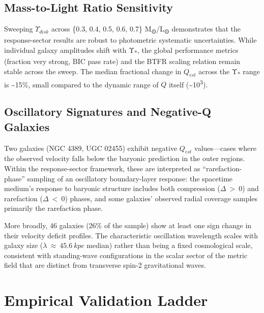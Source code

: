 \documentclass[11pt]{article}
\begin{document}
\subsection{Mass-to-Light Ratio Sensitivity}\label{mass-to-light-ratio-sensitivity}

Sweeping \(\Upsilon_{disk}\) across \{0.3, 0.4, 0.5, 0.6, 0.7\} M\textsubscript{⊙}/L\textsubscript{⊙} demonstrates that the response-sector results are robust to photometric systematic uncertainties. While individual galaxy amplitudes shift with Υ\textsubscript{*}, the global performance metrics (fraction very strong, BIC pass rate) and the BTFR scaling relation remain stable across the sweep. The median fractional change in \(Q_{est}\) across the Υ\textsubscript{*} range is \textasciitilde15\%, small compared to the dynamic range of \(Q\) itself (\textasciitilde10\textsuperscript{3}).

\subsection{Oscillatory Signatures and Negative-Q Galaxies}\label{oscillatory-signatures-and-negative-q-galaxies}

Two galaxies (NGC 4389, UGC 02455) exhibit negative \(Q_{est}\) values---cases where the observed velocity falls below the baryonic prediction in the outer regions. Within the response-sector framework, these are interpreted as ``rarefaction-phase'' sampling of an oscillatory boundary-layer response: the spacetime medium's response to baryonic structure includes both compression (\(\Delta\  > \ 0\)) and rarefaction (\(\Delta\  < \ 0\)) phases, and some galaxies' observed radial coverage samples primarily the rarefaction phase.

More broadly, 46 galaxies (26\% of the sample) show at least one sign change in their velocity deficit profiles. The characteristic oscillation wavelength scales with galaxy size (\(\lambda\  \approx \ 45.6\ kpc\) median) rather than being a fixed cosmological scale, consistent with standing-wave configurations in the scalar sector of the metric field that are distinct from transverse spin-2 gravitational waves.


\section{Empirical Validation Ladder}\label{empirical-validation-ladder}
\end{document}

